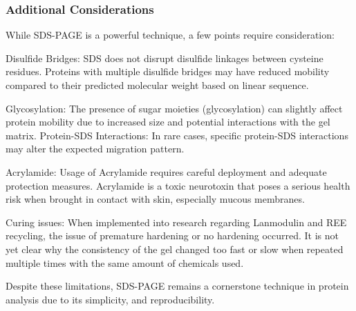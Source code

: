 \subsubsection{Additional Considerations}
While SDS-PAGE is a powerful technique, a few points require consideration:

Disulfide Bridges: SDS does not disrupt disulfide linkages between cysteine residues.
Proteins with multiple disulfide bridges may have reduced mobility compared to their
predicted molecular weight based on linear sequence.

Glycosylation: The presence of sugar moieties (glycosylation) can slightly affect protein
mobility due to increased size and potential interactions with the gel matrix.
Protein-SDS Interactions: In rare cases, specific protein-SDS interactions may alter the
expected migration pattern.

Acrylamide: Usage of Acrylamide requires careful deployment and adequate protection
measures. Acrylamide is a toxic neurotoxin that poses a serious health risk when brought
in contact with skin, especially mucous membranes.

Curing issues: When implemented into research regarding Lanmodulin and REE recycling,
the issue of premature hardening or no hardening occurred. It is not yet clear why the
consistency of the gel changed too fast or slow when repeated multiple times with the
same amount of chemicals used.

Despite these limitations, SDS-PAGE remains a cornerstone technique in protein analysis
due to its simplicity, and reproducibility.